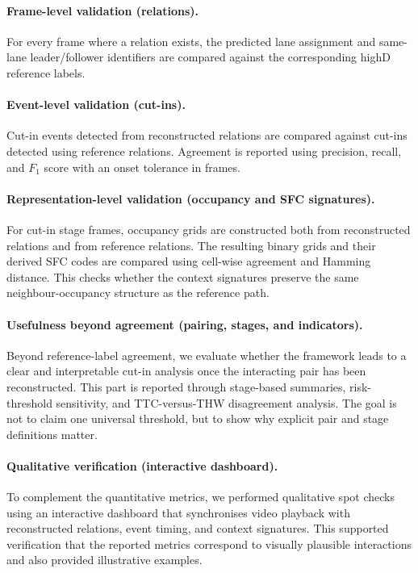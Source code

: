 \documentclass[12pt,a4paper,twoside,openright]{report}
\begin{document}
    \paragraph{Frame-level validation (relations).}
    For every frame where a relation exists, the predicted lane assignment and same-lane leader/follower identifiers are compared against the corresponding highD reference labels.

    \paragraph{Event-level validation (cut-ins).}
    Cut-in events detected from reconstructed relations are compared against cut-ins detected using reference relations. Agreement is reported using precision, recall, and $F_1$ score with an onset tolerance in frames.

    \paragraph{Representation-level validation (occupancy and SFC signatures).}
    For cut-in stage frames, occupancy grids are constructed both from reconstructed relations and from reference relations. The resulting binary grids and their derived SFC codes are compared using cell-wise agreement and Hamming distance. This checks whether the context signatures preserve the same neighbour-occupancy structure as the reference path.

    \paragraph{Usefulness beyond agreement (pairing, stages, and indicators).}
    Beyond reference-label agreement, we evaluate whether the framework leads to a clear and interpretable cut-in analysis once the interacting pair has been reconstructed. This part is reported through stage-based summaries, risk-threshold sensitivity, and TTC-versus-THW disagreement analysis. The goal is not to claim one universal threshold, but to show why explicit pair and stage definitions matter.

    \paragraph{Qualitative verification (interactive dashboard).}
    To complement the quantitative metrics, we performed qualitative spot checks using an interactive dashboard that synchronises video playback with reconstructed relations, event timing, and context signatures. This supported verification that the reported metrics correspond to visually plausible interactions and also provided illustrative examples.
\end{document}
